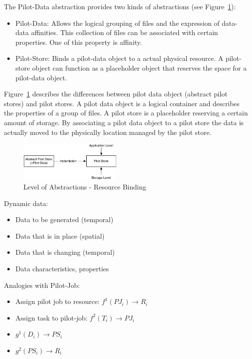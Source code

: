 \documentclass[conference,final]{IEEEtran}
\begin{document}
The Pilot-Data abstraction provides two kinds of abstractions (see Figure~\ref{fig:figures_ps-instantiation}):
\begin{itemize}
    \item Pilot-Data: Allows the logical grouping of files and the expression of data-data affinities. This collection of files can be associated with certain properties. One of this property is affinity.    
    \item Pilot-Store: Binds a pilot-data object to a actual physical resource. A pilot-store object can function as a placeholder object that reserves the space for a pilot-data object.
\end{itemize}


Figure~\ref{fig:figures_ps-instantiation} describes the differences between
pilot data object (abstract pilot stores) and pilot stores. A pilot data object
is a logical container and describes the properties of a group of files. A pilot
store is a placeholder reserving a certain amount of storage. By associating a
pilot data object to a pilot store the data is actually moved to the physically
location managed by the pilot store.

\begin{figure}[htbp]
    \centering
        \includegraphics[width=0.45\textwidth]{figures/ps-instantiation.pdf}
    \caption{Level of Abstractions - Resource Binding}
    \label{fig:figures_ps-instantiation}
\end{figure}
	
\noindent	
Dynamic data:
\begin{itemize}
	\item Data to be generated (temporal)
	\item Data that is in place (spatial)
	\item Data that is changing (temporal)
	\item Data characteristics, properties
\end{itemize}	

\noindent
Analogies with Pilot-Job:
\begin{itemize}
	\item Assign pilot job to resource: $f^{1}(PJ_i) \rightarrow R_i$
	\item Assign task to pilot-job: $f^{2}(T_i) \rightarrow PJ_i$ 

	\item $g^{1} (D_i) \rightarrow PS_i$
	\item $g^{2} (PS_i) \rightarrow R_i$
\end{itemize}
\end{document}
